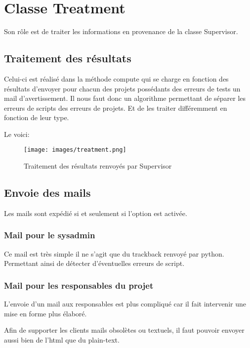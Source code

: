 \newpage

\section*{Classe Treatment}

Son rôle est de traiter les informations en provenance de la classe Supervisor.

\subsection*{Traitement des résultats}

Celui-ci est réalisé dans la méthode compute qui se charge en fonction des résultats d'envoyer pour chacun des projets possédants des erreurs de tests un mail d'avertissement. Il nous faut donc un algorithme permettant de séparer les erreurs de scripts des erreurs de projets. Et de les traiter différemment en fonction de leur type.

Le voici:


\begin{figure}[h!]
	\centering
	\texttt{[image: images/treatment.png]}
	\caption{Traitement des résultats renvoyés par Supervisor}
\end{figure}

\subsection*{Envoie des mails}

Les mails sont expédié si et seulement si l'option est activée.

\subsubsection*{Mail pour le sysadmin}

Ce mail est très simple il ne s'agit que du trackback renvoyé par python. Permettant ainsi de détecter d'éventuelles erreurs de script.

\subsubsection*{Mail pour les responsables du projet}

L'envoie d'un mail aux responsables est plus compliqué car il fait intervenir une mise en forme plus élaboré.

Afin de supporter les clients mails obsolètes ou textuels, il faut pouvoir envoyer aussi bien de l'html que du plain-text.

